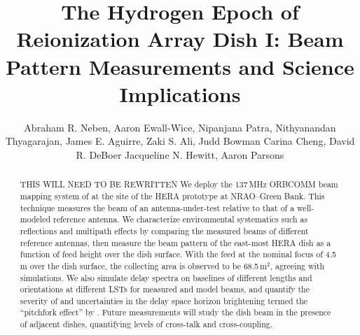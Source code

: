 \documentclass[preprint]{aastex}
\begin{document}
\title{The Hydrogen Epoch of Reionization Array Dish I: Beam Pattern Measurements and Science Implications}


\author{Abraham R. Neben,
Aaron Ewall-Wice,
Nipanjana Patra,
Nithyanandan Thyagarajan,
James E. Aguirre,
Zaki S. Ali,
Judd Bowman
Carina Cheng,
David R. DeBoer
Jacqueline N. Hewitt,
Aaron Parsons}




\begin{abstract}
THIS WILL NEED TO BE REWRITTEN
We deploy the 137\,MHz ORBCOMM beam mapping system of \citet{neben15} at the site of the HERA prototype at NRAO--Green Bank. This technique measures the beam of an antenna-under-test relative to that of a well-modeled reference antenna. We characterize environmental systematics such as reflections and multipath effects by comparing the measured beams of different reference antennas, then measure the beam pattern of the east-most HERA dish as a function of feed height over the dish surface. With the feed at the nominal focus of 4.5\,m over the dish surface, the collecting area is observed to be 68.5\,m$^2$, agreeing with simulations. We also simulate delay spectra on baselines of different lengths and orientations at different LSTs for measured and model beams, and quantify the severity of and uncertainties in the delay space horizon brightening termed the ``pitchfork effect'' by \citet{nithya15}. Future measurements will study the dish beam in the presence of adjacent dishes, quantifying levels of cross-talk and cross-coupling.
\end{abstract}
\end{document}
